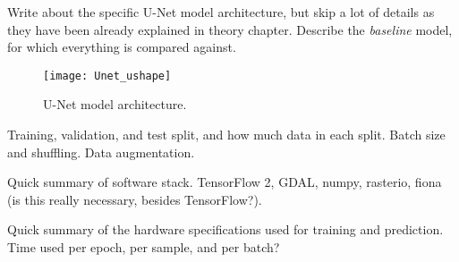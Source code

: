 
Write about the specific U-Net model architecture, but skip a lot of details as they have been already explained in theory chapter.
Describe the \textit{baseline} model, for which everything is compared against.

\begin{figure}[htb]
  \texttt{[image: Unet\_ushape]}
  \caption{%
    U-Net model architecture.
  }
\end{figure}


Training, validation, and test split, and how much data in each split.
Batch size and shuffling.
Data augmentation.


Quick summary of software stack.
TensorFlow 2, GDAL, numpy, rasterio, fiona (is this really necessary, besides TensorFlow?).


Quick summary of the hardware specifications used for training and prediction.
Time used per epoch, per sample, and per batch?
